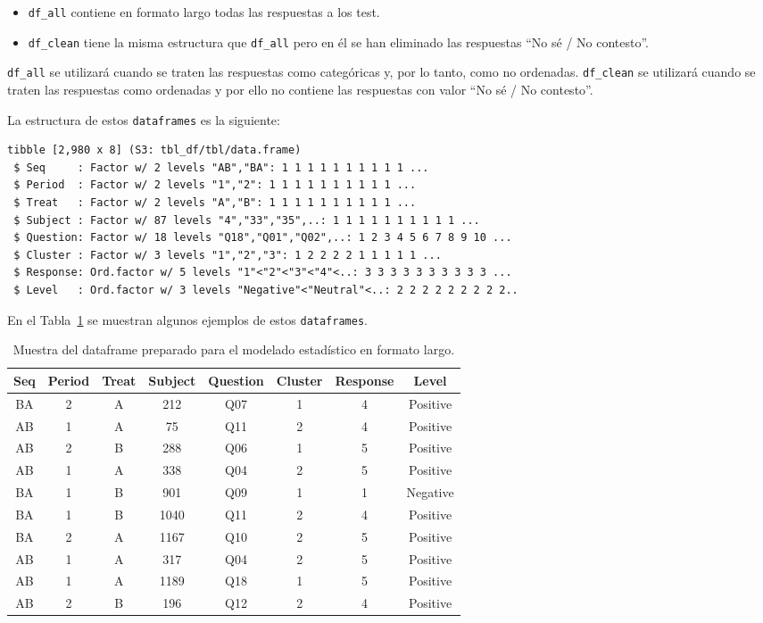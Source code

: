 \documentclass[
  12pt,
  a4paper,
  extrafontsizes,
  onecolumn,
  openright]{memoir}
\providecommand{\tightlist}{%
  \setlength{\itemsep}{0pt}\setlength{\parskip}{0pt}}\usepackage{longtable,booktabs,array}
\begin{document}
\begin{itemize}
\tightlist
\item
  \texttt{df\_all} contiene en formato largo todas las respuestas a los
  test.
\item
  \texttt{df\_clean} tiene la misma estructura que \texttt{df\_all} pero
  en él se han eliminado las respuestas \enquote{No sé / No contesto}.
\end{itemize}

\texttt{df\_all} se utilizará cuando se traten las respuestas como
categóricas y, por lo tanto, como no ordenadas. \texttt{df\_clean} se
utilizará cuando se traten las respuestas como ordenadas y por ello no
contiene las respuestas con valor \enquote{No sé / No contesto}.

La estructura de estos \texttt{dataframes} es la siguiente:

\begin{verbatim}
tibble [2,980 x 8] (S3: tbl_df/tbl/data.frame)
 $ Seq     : Factor w/ 2 levels "AB","BA": 1 1 1 1 1 1 1 1 1 1 ...
 $ Period  : Factor w/ 2 levels "1","2": 1 1 1 1 1 1 1 1 1 1 ...
 $ Treat   : Factor w/ 2 levels "A","B": 1 1 1 1 1 1 1 1 1 1 ...
 $ Subject : Factor w/ 87 levels "4","33","35",..: 1 1 1 1 1 1 1 1 1 1 ...
 $ Question: Factor w/ 18 levels "Q18","Q01","Q02",..: 1 2 3 4 5 6 7 8 9 10 ...
 $ Cluster : Factor w/ 3 levels "1","2","3": 1 2 2 2 2 1 1 1 1 1 ...
 $ Response: Ord.factor w/ 5 levels "1"<"2"<"3"<"4"<..: 3 3 3 3 3 3 3 3 3 3 ...
 $ Level   : Ord.factor w/ 3 levels "Negative"<"Neutral"<..: 2 2 2 2 2 2 2 2 2..
\end{verbatim}

En el Tabla~\ref{tbl-df_clean} se muestran algunos ejemplos de estos
\texttt{dataframes}.

\hypertarget{tbl-df_clean}{}
\begin{longtable}{cccccccc}
\caption{\label{tbl-df_clean}Muestra del dataframe preparado para el modelado estadístico en formato
largo. }\tabularnewline

\toprule
Seq & Period & Treat & Subject & Question & Cluster & Response & Level \\ 
\midrule
BA & 2 & A & 212 & Q07 & 1 & 4 & Positive \\ 
AB & 1 & A & 75 & Q11 & 2 & 4 & Positive \\ 
AB & 2 & B & 288 & Q06 & 1 & 5 & Positive \\ 
AB & 1 & A & 338 & Q04 & 2 & 5 & Positive \\ 
BA & 1 & B & 901 & Q09 & 1 & 1 & Negative \\ 
BA & 1 & B & 1040 & Q11 & 2 & 4 & Positive \\ 
BA & 2 & A & 1167 & Q10 & 2 & 5 & Positive \\ 
AB & 1 & A & 317 & Q04 & 2 & 5 & Positive \\ 
AB & 1 & A & 1189 & Q18 & 1 & 5 & Positive \\ 
AB & 2 & B & 196 & Q12 & 2 & 4 & Positive \\ 
\bottomrule
\end{longtable}
\end{document}
